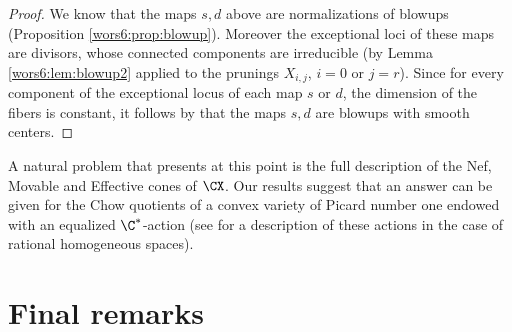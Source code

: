 \documentclass[reqno]{amsproc}
\theoremstyle{definition}
\newtheorem{remark}[theorem]{Remark}
\begin{document}
\begin{proof}
We know that the maps $s,d$ above are normalizations of blowups (Proposition \ref{wors6:prop:blowup}). Moreover the exceptional loci of these maps are divisors, whose connected components are irreducible (by Lemma \ref{wors6:lem:blowup2} applied to the prunings $X_{i,j}$, $i=0$ or $j=r$). Since for every component of the exceptional locus of each map $s$ or $d$, the dimension of the fibers is constant, it follows by \cite[Corollary~4.11]{wors6-AWDuke} that the maps $s,d$ are blowups with smooth centers.
\end{proof}
%

A natural problem that presents at this point is the full description of the Nef, Movable and Effective cones of $\CX$. Our results suggest that an answer can be given for the Chow quotients of a convex variety of Picard number one endowed with an equalized $\C^*$-action (see \cite{wors6-WORS3} for a description of these actions in the case of rational homogeneous spaces). 



\section{Final remarks}\label{wors6:sec:final}
\end{document}
